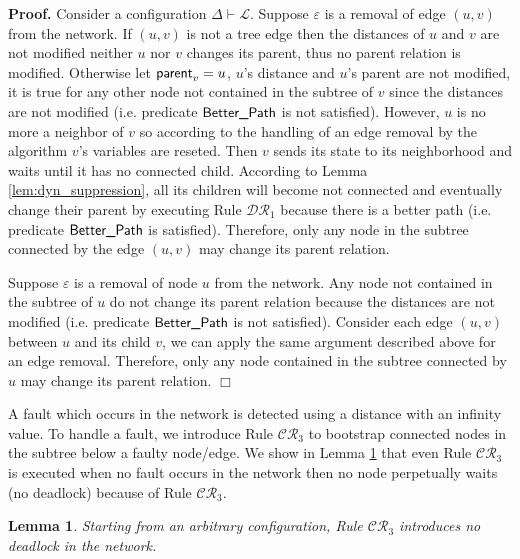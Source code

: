 \documentclass[11pt]{article}
\newtheorem{lemma}{Lemma}
\newenvironment{proof}{\noindent \begin{rm}{\textbf{Proof.} }}{\hspace*{\fill}$\Box$\par\end{rm} \vspace{.3cm}}
\newcommand{\parent}{\mbox{\sf parent}}
\newcommand{\Better}{\mbox{\sf Better\_Path}}
\newcommand{\ARA}{$\mathcal{DR}_1$}
\newcommand{\CRG}{$\mathcal{CR}_3$}
\begin{document}
\begin{proof}
Consider a configuration $\Delta \vdash \mathcal{L}$. Suppose $\varepsilon$ is a removal of edge $(u,v)$ from the network. If $(u,v)$ is not a tree edge then the distances of $u$ and $v$ are not modified neither $u$ nor $v$ changes its parent, thus no parent relation is modified. Otherwise let $\parent_v=u$, $u$'s distance and $u$'s parent are not modified, it is true for any other node not contained in the subtree of $v$ since the distances are not modified (i.e. predicate $\Better$ is not satisfied). However, $u$ is no more a neighbor of $v$ so according to the handling of an edge removal by the algorithm $v$'s variables are reseted. Then $v$ sends its state to its neighborhood and waits until it has no connected child. According to Lemma \ref{lem:dyn_suppression}, all its children will become not connected and eventually change their parent by executing Rule \ARA\/ because there is a better path (i.e. predicate $\Better$ is satisfied). Therefore, only any node in the subtree connected by the edge $(u,v)$ may change its parent relation.

Suppose $\varepsilon$ is a removal of node $u$ from the network. Any node not contained in the subtree of $u$ do not change its parent relation because the distances are not modified (i.e. predicate $\Better$ is not satisfied). Consider each edge $(u,v)$ between $u$ and its child $v$, we can apply the same argument described above for an edge removal. Therefore, only any node contained in the subtree connected by $u$ may change its parent relation.
\end{proof}

A fault which occurs in the network is detected using a distance with an infinity value. To handle a fault, we introduce Rule \CRG\/ to bootstrap connected nodes in the subtree below a faulty node/edge. We show in Lemma \ref{lem:no_deadlock} that even Rule \CRG\/ is executed when no fault occurs in the network then no node perpetually waits (no deadlock) because of Rule \CRG.

\begin{lemma}
Starting from an arbitrary configuration, Rule \CRG\/ introduces no deadlock in the network.
\label{lem:no_deadlock}
\end{lemma}
\end{document}
